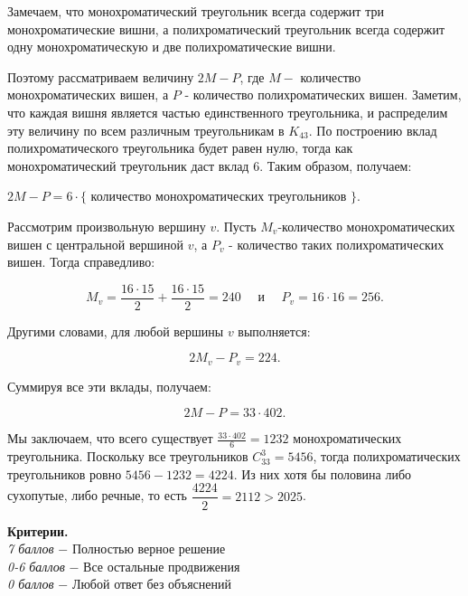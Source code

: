 Замечаем, что монохроматический треугольник всегда содержит три монохроматические вишни, а полихроматический треугольник всегда содержит одну монохроматическую и две полихроматические вишни.

Поэтому рассматриваем величину $2 M-P$, где $M-$ количество монохроматических вишен, а $P$ - количество полихроматических вишен. Заметим, что каждая вишня является частью единственного треугольника, и распределим эту величину по всем различным треугольникам в $K_{43}$. По построению вклад полихроматического треугольника будет равен нулю, тогда как монохроматический треугольник даст вклад 6. Таким образом, получаем:

\centerline{$2 M-P=6 \cdot\{$ количество монохроматических треугольников $\}$.}


Рассмотрим произвольную вершину $v$. Пусть $M_v$-количество монохроматических вишен с центральной вершиной $v$, а $P_v$ - количество таких полихроматических вишен. Тогда справедливо:


$$
M_v=\frac{16 \cdot 15}{2}+\frac{16 \cdot 15}{2}=240 \quad \text { и } \quad P_v=16 \cdot 16=256 .
$$


Другими словами, для любой вершины $v$ выполняется:

$$
2 M_v-P_v=224.
$$


Суммируя все эти вклады, получаем:

$$
2 M-P= 33\cdot 402.
$$


Мы заключаем, что всего существует $\frac{33\cdot402}{6}=1232$ монохроматических треугольника. Поскольку все треугольников $C^3_{33} = 5456$, тогда полихроматических треугольников ровно $5456 - 1232 = 4224$. Из них хотя бы половина либо сухопутые, либо речные, то есть $\dfrac{4224}{2} = 2112 > 2025$.

\textbf{Критерии.} \\
\textit{7 баллов} $-$ Полностью верное решение\\
\textit{0-6 баллов} $-$ Все остальные продвижения\\
\textit{0 баллов} $-$ Любой ответ без объяснений\\